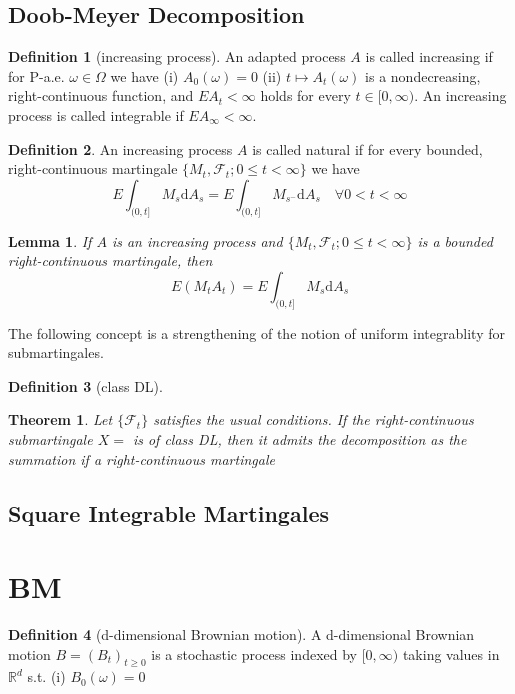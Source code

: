 \documentclass{article}
\newtheorem{Thm}{Theorem}[section]
\newtheorem{Lem}{Lemma}[section]
\theoremstyle{definition}
\newtheorem{Def}{Definition}[section]
\renewcommand{\leq}{\leqslant}
\renewcommand{\geq}{\geqslant}
\newcommand{\<}{\left\langle}
\renewcommand{\>}{\right\rangle}
\begin{document}
\subsection{Doob-Meyer Decomposition}
\begin{Def}[increasing process]
    An adapted process $A$ is called increasing if for P-a.e. $\omega\in\Omega$ we have \newline 
    (i) $A_0(\omega)=0$\newline 
    (ii) $t\mapsto A_t(\omega)$ is a nondecreasing, right-continuous function, and $EA_t<\infty$ holds for every $t\in [0,\infty)$.\newline 
    An increasing process is called integrable if $EA_\infty<\infty$.
\end{Def}
\begin{Def}
    An increasing process $A$ is called natural if for every bounded, right-continuous martingale $\{M_t,\mathcal{F}_t;0\leq t<\infty\}$ we have
    \[ E\int_{(0,t]}M_s\mathrm{d}A_s=E\int_{(0,t]}M_{s^-}\mathrm{d}A_s\quad\forall 0<t<\infty\]
\end{Def}
\begin{Lem}
    If $A$ is an increasing process and $\{M_t,\mathcal{F}_t;0\leq t<\infty\}$ is a bounded right-continuous martingale, then 
    \[ E(M_tA_t)=E\int_{(0,t]}M_s\mathrm{d}A_s \]
\end{Lem}
The following concept is a strengthening of the notion of uniform integrablity for submartingales.
\begin{Def}[class DL]
    
\end{Def}
\begin{Thm}
    Let $\{\mathcal{F}_t\}$ satisfies the usual conditions. If the right-continuous submartingale $X=$ is of class DL,
    then it admits the decomposition as the summation if a right-continuous martingale
\end{Thm}

\subsection{Square Integrable Martingales}




\section{BM}
\begin{Def}[d-dimensional Brownian motion]
    A d-dimensional Brownian motion $B=(B_t)_{t\geq 0}$ is a stochastic process indexed by $[0,\infty)$ taking values in $\mathbb{R}^d$ s.t. \newline 
    (i) $B_0(\omega)=0$

\end{Def}
\end{document}
